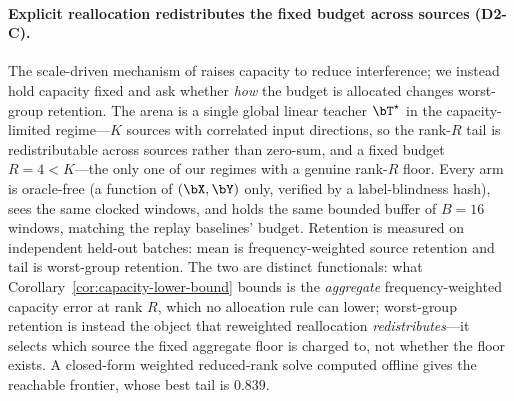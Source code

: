\paragraph{Explicit reallocation redistributes the fixed budget across sources (D2-C).}
The scale-driven mechanism of \citet{huang2026larger} raises capacity to reduce
interference; we instead hold capacity fixed and ask whether \emph{how} the
budget is allocated changes worst-group retention. The arena is a single global
linear teacher $\bT^\star$ in the capacity-limited regime---$K$ sources with
correlated input directions, so the rank-$R$ tail is redistributable across
sources rather than zero-sum, and a fixed budget $R{=}4{<}K$---the only one of
our regimes with a genuine rank-$R$ floor. Every arm is oracle-free (a function
of $(\bX,\bY)$ only, verified by a label-blindness hash), sees the same clocked
windows, and holds the same bounded buffer of $B{=}16$ windows, matching the
replay baselines' budget. Retention is measured on independent held-out batches:
$\mathrm{mean}$ is frequency-weighted source retention and $\mathrm{tail}$ is
worst-group retention. The two are distinct functionals: what
Corollary~\ref{cor:capacity-lower-bound} bounds is the \emph{aggregate}
frequency-weighted capacity error at rank $R$, which no allocation rule can
lower; worst-group retention is instead the object that reweighted reallocation
\emph{redistributes}---it selects which source the fixed aggregate floor is
charged to, not whether the floor exists. A closed-form weighted reduced-rank
solve computed offline gives the reachable frontier, whose best tail is $0.839$.

